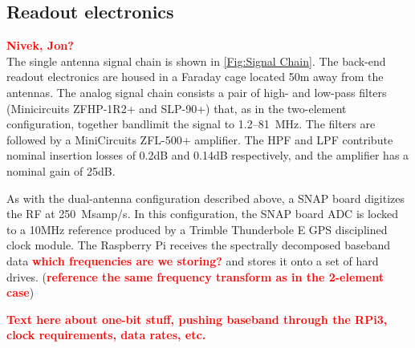 \documentclass{ws-jai}
\newcommand{\attention}[1]{\textcolor{red}{\bf {#1}}}
\begin{document}
% 

\subsection{Readout electronics}
\attention{Nivek, Jon?} \\

The single antenna signal chain is shown in \autoref{Fig:Signal Chain}. 
The back-end readout electronics are housed in a Faraday cage
located 50m away from the antennas. The analog signal chain consists 
a pair of high- and low-pass filters (Minicircuits
ZFHP-1R2+ and SLP-90+) that, as in the two-element configuration, together bandlimit the signal to
1.2--\SI{81}{MHz}. The filters are followed by a MiniCircuits ZFL-500+ amplifier.  The HPF and LPF contribute nominal insertion losses of 0.2dB and 0.14dB respectively, and the amplifier has a nominal gain of 25dB.

As with the dual-antenna configuration described above, a SNAP board digitizes the RF  at 250~Msamp/s. In this configuration, the SNAP board ADC is locked to a 10MHz reference produced by a Trimble Thunderbole E GPS disciplined clock module. The Raspberry Pi receives the spectrally decomposed baseband data \attention{which frequencies are we storing?} and stores it onto a set of hard drives. 
(\attention{reference the same frequency transform as in the 2-element case})

\attention{Text here about one-bit stuff, pushing baseband through the RPi3,
clock requirements, data rates, etc.}
\end{document}
